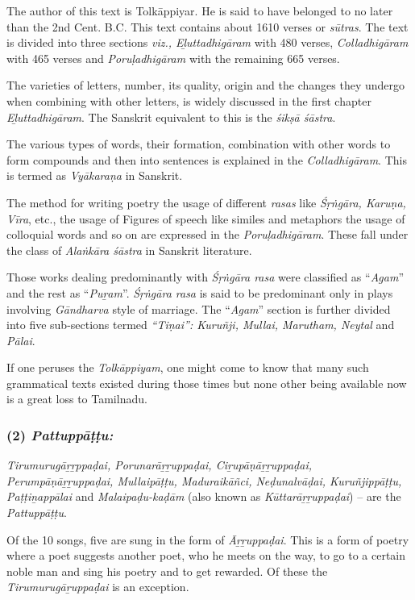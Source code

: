 The author of this text is Tolkāppiyar. He is said to have belonged to no later than the 2nd Cent. B.C. This text contains about 1610 verses or \textit{sūtras}. The text is divided into three sections \textit{viz., Eḻuttadhigāram} with 480 verses, \textit{Colladhigāram} with 465 verses and \textit{Poruḷadhigāram} with the remaining 665 verses.

The varieties of letters, number, its quality, origin and the changes they undergo when combining with other letters, is widely discussed in the first chapter \textit{Eḻuttadhigāram}. The Sanskrit equivalent to this is the \textit{śikṣā śāstra}.

The various types of words, their formation, combination with other words to form compounds and then into sentences is explained in the \textit{Colladhigāram}. This is termed as \textit{Vyākaraṇa} in Sanskrit.

The method for writing poetry the usage of different \textit{rasas} like \textit{Śṛṅgāra, Karuṇa, Vīra}, etc., the usage of Figures of speech like similes and metaphors the usage of colloquial words and so on are expressed in the \textit{Poruḷadhigāram}. These fall under the class of \textit{Alaṅkāra śāstra} in Sanskrit literature.

Those works dealing predominantly with \textit{Śṛṅgāra rasa} were classified as “\textit{Agam}” and the rest as “\textit{Puṟam}”. \textit{Śṛṅgāra rasa} is said to be predominant only in plays involving \textit{Gāndharva} style of marriage. The “\textit{Agam}” section is further divided into five sub-sections termed \textit{“Tiṇai”: Kuruñji, Mullai, Marutham, Neytal} and \textit{ Pālai}.

If one peruses the \textit{Tolkāppiyam}, one might come to know that many such grammatical texts existed during those times but none other being available now is a great loss to Tamilnadu.


\subsubsection*{(2) \textit{Pattuppāṭṭu:}}

\vskip -7pt

\textit{Tirumurugāṟṟppaḍai, Porunarāṟṟuppaḍai, Ciṟupāṇāṟṟuppaḍai, Perumpāṇā\-ṟṟuppaḍai, Mullaipāṭṭu, Maduraikāñci, Neḍunalvāḍai, Kuruñjippāṭṭu, Paṭṭi\-ṉappālai} and \textit{Malaipaḍu-kaḍām} (also known as \textit{Kūttarāṟṟuppaḍai}) – are the \textit{Pattuppāṭṭu}.

Of the 10 songs, five are sung in the form of \textit{Āṟṟuppaḍai}. This is a form of poetry where a poet suggests another poet, who he meets on the way, to go to a certain noble man and sing his poetry and to get rewarded. Of these the \textit{Tirumurugāṟuppaḍai} is an exception.

